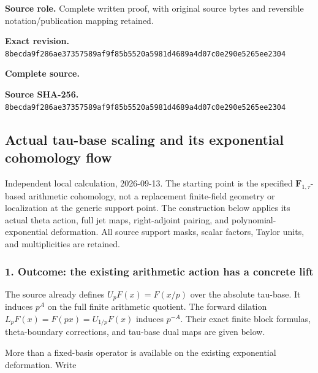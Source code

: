 \documentclass{article}
\begin{document}
\maketitle
\begingroup
\sloppy
\small

\noindent\textbf{Source role.} Complete written proof, with original source bytes and reversible notation/publication mapping retained.\par
\noindent\textbf{Exact revision.} \nolinkurl{8becda9f286ae37357589af9f85b5520a5981d4689a4d07c0e290e5265ee2304}\par
\noindent\textbf{Complete source.} \par
\noindent\textbf{Source SHA-256.} \nolinkurl{8becda9f286ae37357589af9f85b5520a5981d4689a4d07c0e290e5265ee2304}\par\medskip
\subsection{Actual tau-base scaling and its exponential cohomology flow}\label{endpoint-f1_scaling--actual-tau-base-scaling-and-its-exponential-cohomology-flow}

Independent local calculation, 2026-09-13. The starting point is the specified \(\mathbf F_{1,\tau}\)-based arithmetic cohomology, not a replacement finite-field geometry or localization at the generic support point. The construction below applies its actual theta action, full jet maps, right-adjoint pairing, and polynomial-exponential deformation. All source support masks, scalar factors, Taylor units, and multiplicities are retained.

\subsubsection{1. Outcome: the existing arithmetic action has a concrete lift}\label{endpoint-f1_scaling--outcome-the-existing-arithmetic-action-has-a-concrete-lift}

The source already defines \(U_p F(x)=F(x/p)\) over the absolute tau-base. It induces \(p^A\) on the full finite arithmetic quotient. The forward dilation \(L_p F(x)=F(px)=U_{1/p}F(x)\) induces \(p^{-A}\). Their exact finite block formulas, theta-boundary corrections, and tau-base dual maps are given below.

More than a fixed-basis operator is available on the existing exponential deformation. Write
\end{document}
